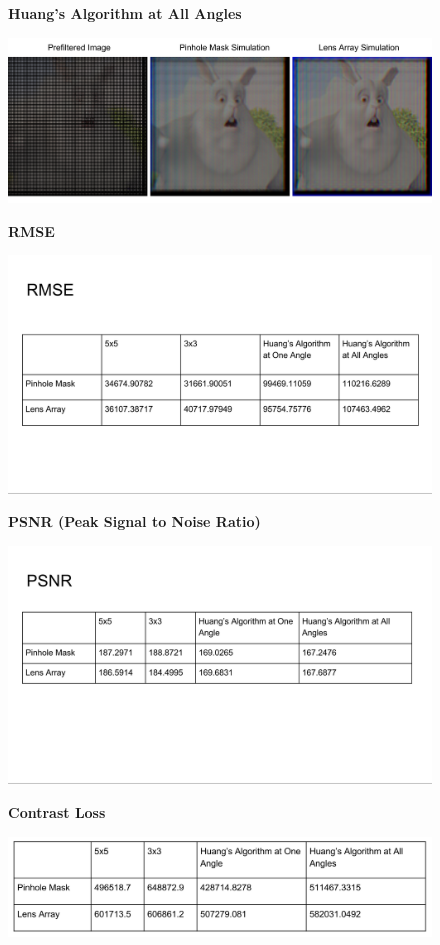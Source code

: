 \begin{figure}
    \centering
    \textbf{Huang's Algorithm at All Angles}\par\medskip
    \includegraphics[width=6in]{chapters/chapter9/images/Huang_all_angle.png}
\end{figure}

\begin{figure}
    \centering
    \textbf{RMSE}\par\medskip
    \includegraphics[width=6in]{chapters/chapter9/images/RMSE.png}
\end{figure}

\begin{figure}
    \centering
    \textbf{PSNR (Peak Signal to Noise Ratio)}\par\medskip
    \includegraphics[width=6in]{chapters/chapter9/images/PSNR.png}
\end{figure}

\begin{figure}
    \centering
    \textbf{Contrast Loss}\par\medskip
    \includegraphics[width=6in]{chapters/chapter9/images/Contrast_Loss.png}
\end{figure}
